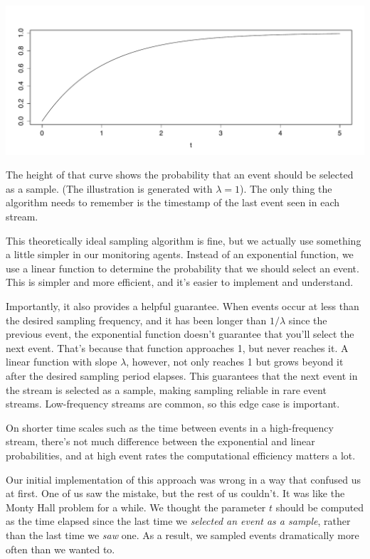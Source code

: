 \documentclass{vivid_layout}
\begin{document}
\begin{center}
\includegraphics[width=.85\linewidth]{sketch-sampling/exponential-probability}
\end{center}

The height of that curve shows the probability that an event should be selected
as a sample. (The illustration is generated with $\lambda = 1$).
The only thing the algorithm needs to remember is the timestamp of the last
event seen in each stream.

This theoretically ideal sampling algorithm is fine, but we actually use
something a little simpler in our monitoring agents. Instead of an exponential
function, we use a linear function to determine the probability that we should
select an event. This is simpler and more efficient, and it's easier to implement
and understand.

Importantly, it also provides a helpful guarantee. When events occur at less
than the desired sampling frequency, and it has been longer than $1/\lambda$
since the previous event, the exponential function doesn't guarantee that you'll
select the next event. That's because that function approaches 1, but never
reaches it. A linear function with slope $\lambda$, however, not only reaches 1
but grows beyond it after the desired sampling period elapses. This guarantees
that the next event in the stream is selected as a sample, making sampling
reliable in rare event streams. Low-frequency streams are common, so this edge
case is important.

On shorter time scales such as the time between events in a high-frequency
stream, there's not much difference between the exponential and linear
probabilities, and at high event rates the computational efficiency matters a
lot.

Our initial implementation of this approach was wrong in a way that confused us
at first. One of us saw the mistake, but the rest of us couldn't. It was like
the Monty Hall problem for a while. We thought the parameter $t$ should be
computed as the time elapsed since the last time we \emph{selected an event as a
sample}, rather than the last time we \emph{saw} one. As a result, we sampled
events dramatically more often than we wanted to.
\end{document}

